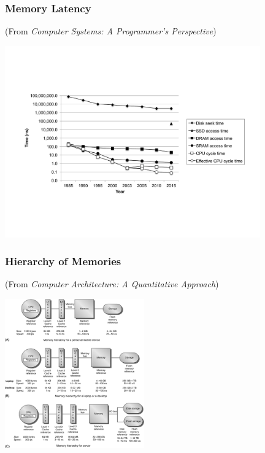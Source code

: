 \documentclass{beamer}
\begin{document}
\begin{frame}%
\frametitle{Memory Latency}
\tiny
(From \emph{Computer Systems: A Programmer's Perspective})

\begin{center}
\includegraphics[width=11cm]{cpumemgap.pdf}
\end{center}

\end{frame}

\begin{frame}[fragile]
\frametitle{Hierarchy of Memories}
\tiny
(From \emph{Computer Architecture: A Quantitative Approach})

\begin{center}
\includegraphics[width=6cm]{hierarchy.png}
\end{center}

\end{frame}
\end{document}
